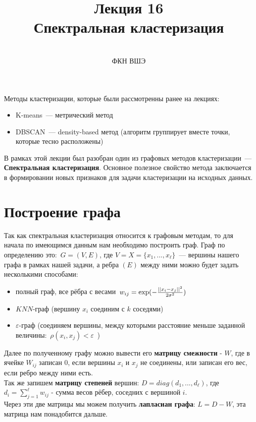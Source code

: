 \documentclass[12pt,fleqn]{article}
\begin{document}
\title{Лекция 16\\Спектральная кластеризация}
\author{\,\,\\ФКН ВШЭ}
\maketitle

Методы кластеризации, которые были рассмотренны ранее на лекциях:

\begin{itemize}
	\item K-means~--- метрический метод
	\item DBSCAN~--- density-based метод (алгоритм группирует вместе точки, которые тесно расположены)
\end{itemize}

В рамках этой лекции был разобран один из графовых методов кластеризации~--- {\bf Спектральная кластеризация}. Основное полезное свойство метода заключается в формировании новых признаков для задачи кластеризации на исходных данных.

\section{Построение графа}
Так как спектральная кластеризация относится к графовым методам, то для начала по имеющимся данным нам необходимо построить граф. Граф по определению это:~$G=(V,E)$, где $V=X=\{x_1,...,x_{\ell}\}$~--- вершины нашего графа в рамках нашей задачи, а ребра $(E)$ между ними можно будет задать несколькими способами:

\begin{itemize}
	\item полный граф, все рёбра с весами~$w_{ij} = \large\exp(-\frac{||x_i - x_j||^2}{2\sigma^2})$~
	\item $KNN$-граф (вершину $x_i$ соединим с $k$ соседями)
	\item $\varepsilon$-граф (соединяем вершины, между которыми расстояние меньше заданной величины:~$\rho(x_i,x_j)<\varepsilon$~)
\end{itemize}

Далее по полученному графу можно вывести его {\bf матрицу смежности} - $W$, где в ячейке $W_{ij}$ записан $0$, если вершины $x_i$ и $x_j$ не соединены, или записан его вес, если ребро между ними есть.\\
Так же запишем {\bf матрицу степеней} вершин: $D=diag(d_1,...,d_{\ell})$, где $d_i = \sum^{\ell}_{j=1}w_{ij}$ - сумма весов рёбер, соседних с вершиной $i$.\\
Через эти две матрицы мы можем получить {\bf лапласиан графа}: $L = D - W$, эта матрица нам понадобится дальше.
\end{document}
